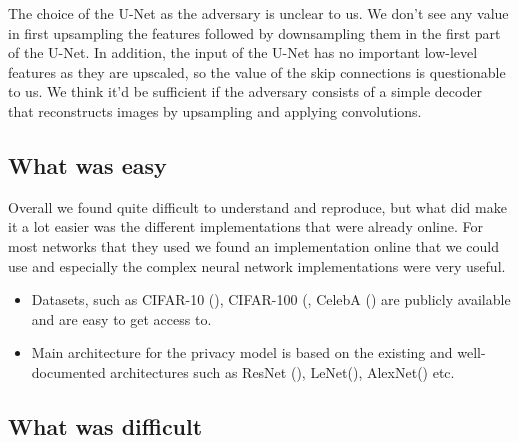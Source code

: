 The choice of the U-Net as the adversary is unclear to us. We don't see any value in first upsampling the features followed by downsampling them in the first part of the U-Net. In addition, the input of the U-Net has no important low-level features as they are upscaled, so the value of the skip connections is questionable to us. We think it'd be sufficient if the adversary consists of a simple decoder that reconstructs images by upsampling and applying convolutions.

\newpage
\subsection{What was easy}


Overall we found \cite{xiang2020interpretable} quite difficult to understand and reproduce, but what did make it a lot easier was the different implementations that were already online. For most networks that they used we found an implementation online that we could use and especially the complex neural network implementations were very useful. 

\begin{itemize}
    \item Datasets, such as CIFAR-10 (\cite{cifar10}), CIFAR-100 (\cite{cifar100}, CelebA (\cite{CelebA}) are publicly available and are easy to get access to.
    \item Main architecture for the privacy model is based on the existing and well-documented architectures such as ResNet (\cite{DBLP:journals/corr/HeZRS15}), LeNet(\cite{lecun1998gradient}), AlexNet(\cite{AlexNet}) etc.
\end{itemize}

\subsection{What was difficult}

